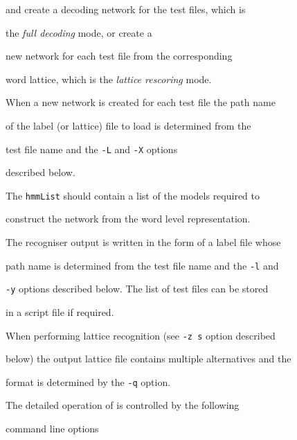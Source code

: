 and create a decoding network for the test files, which is


the {\em full decoding} mode, or create a


new network for each test file from the corresponding 


word lattice, which is the {\em lattice rescoring} mode. 


When a new network is created for each test file the path name


of the label (or lattice) file to load is determined from the


test file name and the \texttt{-L} and \texttt{-X} options


described below.





The \texttt{hmmList} should contain a list of the models required to


construct the network from the word level representation.





The recogniser output is written in the form of a label file whose


path name is determined from the test file name and the \texttt{-l} and 


\texttt{-y} options described below. The list of test files can be stored 


in a script file if required.


When performing lattice recognition (see \texttt{-z s} option described


below) the output lattice file contains multiple alternatives and the


format is determined by the \texttt{-q} option.





The detailed operation of  is controlled by the following


command line options


